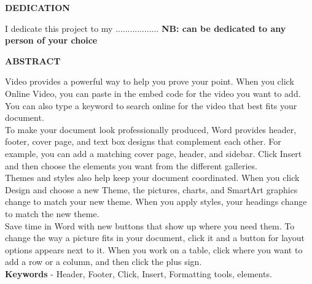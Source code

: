 \documentclass[12pt,a4paper]{report}
\begin{document}

\newpage
\begin{center}
 \textbf{DEDICATION}
\end{center}
\vspace{0.2cm}
I dedicate this project to my ..................
\textbf{NB: can be dedicated to any person of your choice}

\newpage
\begin{center}
 \textbf{ABSTRACT}
\end{center}
\vspace{0.2cm}
Video provides a powerful way to help you prove your point. When you click Online Video, you can paste in the embed code for the video you want to add. You can also type a keyword to search online for the video that best fits your document.\\
To make your document look professionally produced, Word provides header, footer, cover page, and text box designs that complement each other. For example, you can add a matching cover page, header, and sidebar. Click Insert and then choose the elements you want from the different galleries.\\
Themes and styles also help keep your document coordinated. When you click Design and choose a new Theme, the pictures, charts, and SmartArt graphics change to match your new theme. When you apply styles, your headings change to match the new theme.\\
Save time in Word with new buttons that show up where you need them. To change the way a picture fits in your document, click it and a button for layout options appears next to it. When you work on a table, click where you want to add a row or a column, and then click the plus sign.
\\

\vspace{0.5cm}
\textbf{Keywords} - Header, Footer, Click, Insert, Formatting tools, elements. \\

\newpage
\tableofcontents %

\newpage
\listoffigures
{}
\end{document}
